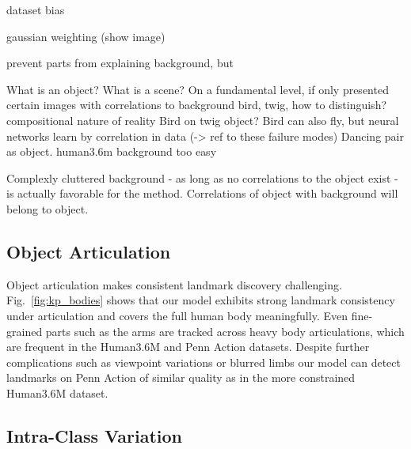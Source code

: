 		dataset bias

		gaussian weighting (show image)

		prevent parts from explaining background, but

		What is an object? What is a scene? On a fundamental level, if only presented certain images with correlations to background \eg bird, twig, how to distinguish?
		compositional nature of reality
		Bird on twig object? Bird can also fly, but neural networks learn by correlation in data (-> ref to these failure modes)
		Dancing pair as object.
		human3.6m background too easy

		Complexly cluttered background - as long as no correlations to the object exist - is actually favorable for the method. Correlations of object with background will belong to object.

	\subsection{Object Articulation}\label{sec:articulation}
		Object articulation makes consistent landmark discovery challenging.
		Fig.~\ref{fig:kp_bodies} shows that our model exhibits strong landmark consistency under articulation and covers the full human body meaningfully.
		Even fine-grained parts such as the arms are tracked across heavy body articulations, which are frequent in the Human3.6M and Penn Action datasets.
		Despite further complications such as viewpoint variations or blurred limbs our model can detect landmarks on Penn Action of similar quality as in the more constrained Human3.6M dataset.

	\subsection{Intra-Class Variation}\label{sec:intraclass}

